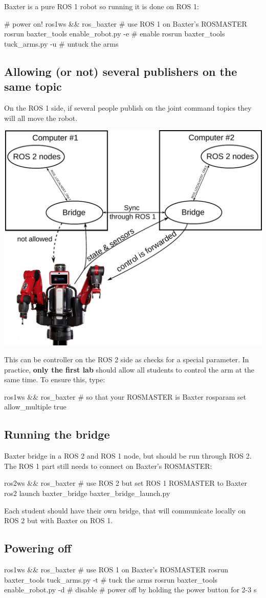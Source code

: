 \documentclass{ecnreport}
\begin{document}
Baxter is a pure ROS 1 robot so running it is done on ROS 1:
\begin{bashcodelarge}
 # power on!
 ros1ws && ros_baxter # use ROS 1 on Baxter's ROSMASTER
 rosrun baxter_tools enable_robot.py -e  # enable
 rosrun baxter_tools tuck_arms.py -u # untuck the arms
\end{bashcodelarge}

\subsection{Allowing (or not) several publishers on the same topic}

On the ROS 1 side, if several people publish on the joint command topics they will all move the robot.

\begin{center}
 \includegraphics[width=.5\linewidth]{sync}
\end{center}


This can be controller on the ROS 2 side as  checks for a special parameter. In practice, {\bf only the first lab} should allow all students to control the arm at the same time. To ensure this, type:
 \begin{bashcodelarge}
 ros1ws && ros_baxter # so that your ROSMASTER is Baxter
 rosparam set allow_multiple true
\end{bashcodelarge}

\subsection{Running the bridge}

Baxter bridge in a ROS 2 and ROS 1 node, but should be run through ROS 2. The ROS 1 part still needs to connect on Baxter's ROSMASTER:
 \begin{bashcodelarge}
 ros2ws && ros_baxter # use ROS 2 but set ROS 1 ROSMASTER to Baxter
 ros2 launch baxter_bridge baxter_bridge_launch.py
\end{bashcodelarge}

Each student should have their own bridge, that will communicate locally on ROS 2 but with Baxter on ROS 1.

\subsection{Powering off}

\begin{bashcodelarge}
 ros1ws && ros_baxter # use ROS 1 on Baxter's ROSMASTER
 rosrun baxter_tools tuck_arms.py -t # tuck the arms
 rosrun baxter_tools enable_robot.py -d  # disable
 # power off by holding the power button for 2-3 s
\end{bashcodelarge}
\end{document}

